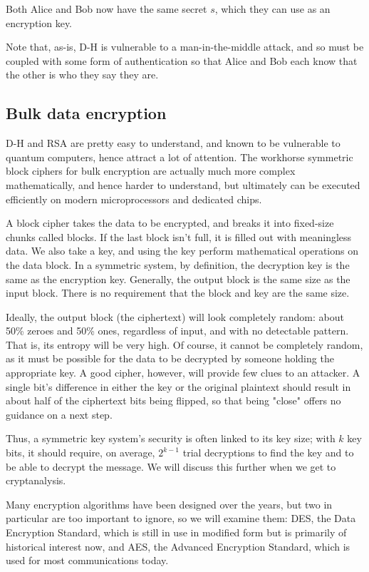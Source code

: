 Both Alice and Bob now have the same secret $s$, which they can use as
an encryption key.

Note that, as-is, D-H is vulnerable to a man-in-the-middle attack, and
so must be coupled with some form of authentication so that Alice and
Bob each know that the other is who they say they are.

\subsection{Bulk data encryption}

D-H and RSA are pretty easy to understand, and known to be vulnerable
to quantum computers, hence attract a lot of attention. The workhorse
symmetric block ciphers for bulk encryption are actually much more
complex mathematically, and hence harder to understand, but ultimately
can be executed efficiently on modern microprocessors and dedicated
chips.

A block cipher takes the data to be encrypted, and breaks it into
fixed-size chunks called blocks.  If the last block isn't full, it is
filled out with meaningless data.  We also take a key, and using the
key perform mathematical operations on the data block.  In a symmetric
system, by definition, the decryption key is the same as the
encryption key.  Generally, the output block is the same size as the
input block.  There is no requirement that the block and key are the
same size.

Ideally, the output block (the ciphertext) will look completely
random: about 50\% zeroes and 50\% ones, regardless of input, and with
no detectable pattern.  That is, its entropy will be very high.  Of
course, it cannot be completely random, as it must be possible for the
data to be decrypted by someone holding the appropriate key.  A good
cipher, however, will provide few clues to an attacker.  A single
bit's difference in either the key or the original plaintext should
result in about half of the ciphertext bits being flipped, so that
being "close" offers no guidance on a next step.

Thus, a symmetric key system's security is often linked to its key
size; with $k$ key bits, it should require, on average, $2^{k-1}$
trial decryptions to find the key and to be able to decrypt the
message.  We will discuss this further when we get to cryptanalysis.

Many encryption algorithms have been designed over the years, but two
in particular are too important to ignore, so we will examine them:
DES, the Data Encryption Standard, which is still in use in modified
form but is primarily of historical interest now, and AES, the
Advanced Encryption Standard, which is used for most communications
today.

